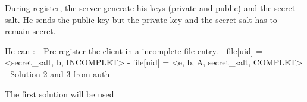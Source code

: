 \documentclass[../report.tex]{subfiles}
\begin{document}
During register, the server generate his keys (private and public) and the secret salt. He sends the public key but the private key and the secret salt has to remain secret.

He can :
- Pre register the client in a incomplete file entry.
   - file[uid] = <secret\_salt, b, INCOMPLET>
   - file[uid] = <e, b, A, secret\_salt, COMPLET>
- Solution 2 and 3 from auth

The first solution will be used




% 
% 
% 
% 
% 
% 
% 
% 
\end{document}
